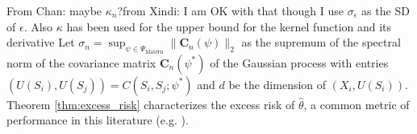 \documentclass[12pt]{article}
\newcommand{\CP}[1]{{\color{purple}From Chan: #1}}
\newcommand{\XL}[1]{{\color{blue}from Xindi: #1}}
\begin{document}
 
 
\CP{maybe $\kappa_n$?}\XL{I am OK with that though I use $\sigma_{\epsilon}$ as the SD of $\epsilon$. Also $\kappa$ has been used for the upper bound for the kernel function and its derivative}
Let $\sigma_{n} = \sup_{\psi\in \Psi_{\text{Mat\'ern}}}\|\mathbf{C}_n(\psi)\|_2$ as the supremum of the spectral norm of the covariance matrix $\mathbf{C}_n(\psi^*)$ of the Gaussian process with entries $(U(S_i), U(S_j)) = C(S_i,S_j;\psi^*)$ and $d$ be the dimension of $(X_i,U(S_i))$. Theorem \ref{thm:excess_risk} characterizes the excess risk of $\widehat\theta$, a common metric of performance in this literature (e.g. \citet{Zhao2012, Dias2018, KitagawaTetenov2018}).
\end{document}
